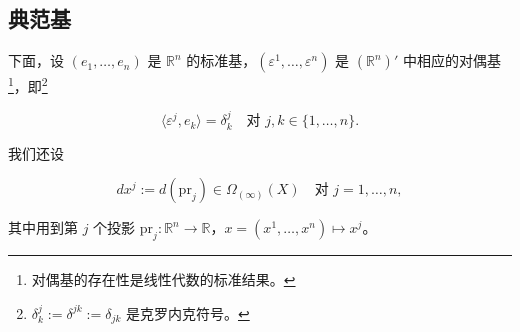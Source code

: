 \subsection*{典范基}

下面，设 $ (e_{1},\ldots,e_{n}) $ 是 $ \mathbb{R}^{n} $ 的标准基，$ (\varepsilon^{1},\ldots,\varepsilon^{n}) $ 是 $ (\mathbb{R}^{n})' $ 中相应的对偶基\footnote{对偶基的存在性是线性代数的标准结果。}，即\footnote{$ \delta_{k}^{j} := \delta^{jk} := \delta_{jk} $ 是克罗内克符号。}

\[
\langle\varepsilon^{j},e_{k}\rangle = \delta_{k}^{j} \quad \text{对 } j,k \in \{1,\ldots,n\} .
\]

我们还设

\[
dx^{j} := d(\mathrm{pr}_{j}) \in \Omega_{(\infty)}(X) \quad \text{对 } j = 1,\ldots,n ,
\]

其中用到第 $ j $ 个投影 $ \mathrm{pr}_{j} : \mathbb{R}^{n} \to \mathbb{R} $，$ x = (x^{1},\ldots,x^{n}) \mapsto x^{j} $。

